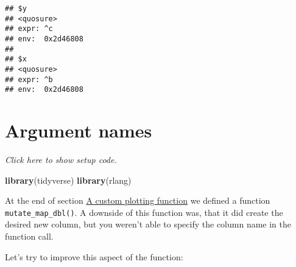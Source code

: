 \documentclass[]{book}
\newenvironment{Shaded}{\begin{snugshade}}{\end{snugshade}}
\newcommand{\ControlFlowTok}[1]{\textcolor[rgb]{0.13,0.29,0.53}{\textbf{#1}}}
\newcommand{\DecValTok}[1]{\textcolor[rgb]{0.00,0.00,0.81}{#1}}
\newcommand{\KeywordTok}[1]{\textcolor[rgb]{0.13,0.29,0.53}{\textbf{#1}}}
\newcommand{\NormalTok}[1]{#1}
\newcommand{\OperatorTok}[1]{\textcolor[rgb]{0.81,0.36,0.00}{\textbf{#1}}}
\newcommand{\StringTok}[1]{\textcolor[rgb]{0.31,0.60,0.02}{#1}}
\begin{document}
\begin{verbatim}
## $y
## <quosure>
## expr: ^c
## env:  0x2d46808
## 
## $x
## <quosure>
## expr: ^b
## env:  0x2d46808
\end{verbatim}

\hypertarget{argnames}{%
\section{Argument names}\label{argnames}}

\emph{Click here to show setup code.}

\begin{Shaded}
\begin{Highlighting}[]
\KeywordTok{library}\NormalTok{(tidyverse)}
\KeywordTok{library}\NormalTok{(rlang)}
\end{Highlighting}
\end{Shaded}

At the end of section \protect\hyperlink{colname}{A custom plotting function} we defined a function \texttt{mutate\_map\_dbl()}.
A downside of this function was, that it did create the desired new column, but you weren't able to specify the column name in the function call.

Let's try to improve this aspect of the function:

\begin{Shaded}
\end{Shaded}
\end{document}
